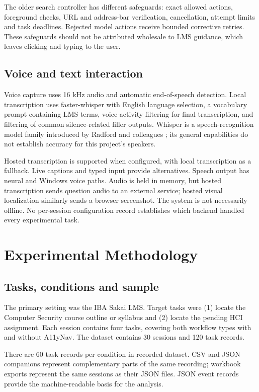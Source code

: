 \documentclass[11pt,a4paper]{article}
\begin{document}
The older search controller has different safeguards: exact allowed actions, foreground checks, URL and address-bar verification, cancellation, attempt limits and task deadlines. Rejected model actions receive bounded corrective retries. These safeguards should not be attributed wholesale to LMS guidance, which leaves clicking and typing to the user.

\subsection{Voice and text interaction}
Voice capture uses 16 kHz audio and automatic end-of-speech detection. Local transcription uses faster-whisper with English language selection, a vocabulary prompt containing LMS terms, voice-activity filtering for final transcription, and filtering of common silence-related filler outputs. Whisper is a speech-recognition model family introduced by Radford and colleagues \cite{radford}; its general capabilities do not establish accuracy for this project's speakers.

Hosted transcription is supported when configured, with local transcription as a fallback. Live captions and typed input provide alternatives. Speech output has neural and Windows voice paths. Audio is held in memory, but hosted transcription sends question audio to an external service; hosted visual localization similarly sends a browser screenshot. The system is not necessarily offline. No per-session configuration record establishes which backend handled every experimental task.

\section{Experimental Methodology}
\subsection{Tasks, conditions and sample}
The primary setting was the IBA Sakai LMS. Target tasks were (1) locate the Computer Security course outline or syllabus and (2) locate the pending HCI assignment. Each session contains four tasks, covering both workflow types with and without A11yNav. The dataset contains 30 sessions and 120 task records.

There are 60 task records per condition in recorded dataset. CSV and JSON companions represent complementary parts of the same recording; workbook exports represent the same sessions as their JSON files. JSON event records provide the machine-readable basis for the analysis.
\end{document}
